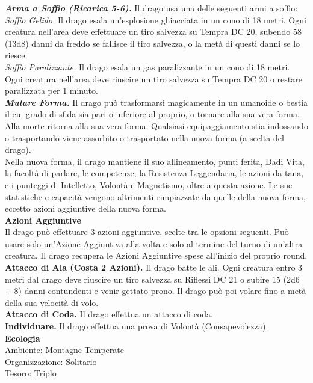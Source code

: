\begin{multicols}{2}
\emph{\textbf{Arma a Soffio (Ricarica 5-6).}} Il drago usa una delle seguenti armi a soffio:\\
\emph{Soffio Gelido.} Il drago esala un'esplosione ghiacciata in un cono di 18 metri. Ogni creatura nell'area deve effettuare un tiro salvezza su Tempra DC 20, subendo 58 (13d8) danni da freddo se fallisce il tiro salvezza, o la metà di questi danni se lo riesce.\\
\emph{Soffio Paralizzante.} Il drago esala un gas paralizzante in un cono di 18 metri. Ogni creatura nell'area deve riuscire un tiro salvezza su Tempra DC 20 o restare paralizzata per 1 minuto.\\
\emph{\textbf{Mutare Forma.}} Il drago può trasformarsi magicamente in un umanoide o bestia il cui grado di sfida sia pari o inferiore al proprio, o tornare alla sua vera forma. Alla morte ritorna alla sua vera forma. Qualsiasi equipaggiamento stia indossando o trasportando viene assorbito o trasportato nella nuova forma (a scelta del drago).\\
Nella nuova forma, il drago mantiene il suo allineamento, punti ferita, Dadi Vita, la facoltà di parlare, le competenze, la Resistenza Leggendaria, le azioni da tana, e i punteggi di Intelletto, Volontà e Magnetismo, oltre a questa azione. Le sue statistiche e capacità vengono altrimenti rimpiazzate da quelle della nuova forma, eccetto azioni aggiuntive della nuova forma.\\
\textbf{Azioni Aggiuntive}\\
Il drago può effettuare 3 azioni aggiuntive, scelte tra le opzioni seguenti. Può usare solo un'Azione Aggiuntiva alla volta e solo al termine del turno di un'altra creatura. Il drago recupera le Azioni Aggiuntive spese all'inizio del proprio round.\\
\textbf{Attacco di Ala (Costa 2 Azioni).} Il drago batte le ali. Ogni creatura entro 3 metri dal drago deve riuscire un tiro salvezza su Riflessi DC 21 o subire 15 (2d6 + 8) danni contundenti e venir gettato prono. Il drago può poi volare fino a metà della sua velocità di volo.\\
\textbf{Attacco di Coda.} Il drago effettua un attacco di coda.\\
\textbf{Individuare.} Il drago effettua una prova di Volontà (Consapevolezza).\\
\textbf{Ecologia}\\
Ambiente: Montagne Temperate\\
Organizzazione: Solitario\\
Tesoro: Triplo\\

\end{multicols}
